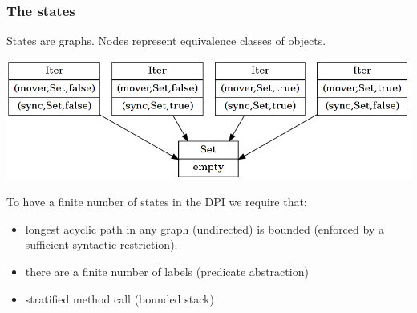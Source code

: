 \documentclass{beamer}
\begin{document}
\begin{frame}
  \frametitle{The states}
  States are graphs.
  Nodes represent equivalence classes of objects.

  \vspace{1ex}

  \includegraphics[width=\linewidth]{state.png}

  \vspace{2ex}

  To have a finite number of states in the DPI we require that:
  \begin{itemize}
  \item longest acyclic path in any graph (undirected) is bounded (enforced by a sufficient syntactic restriction).
  \item there are a finite number of labels (predicate abstraction)
  \item stratified method call (bounded stack)
  \end{itemize}

\end{frame}
\end{document}
